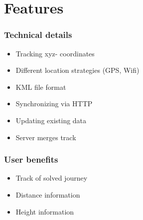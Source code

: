 \section{Features}
\label{sec:features}

\begin{frame}
  \frametitle{Technical details}
  \begin{itemize}
  \item Tracking xyz- coordinates
  \item Different location strategies (GPS, Wifi)
  \item KML file format
  \item Synchronizing via HTTP
  \item Updating existing data
  \item Server merges track
  \end{itemize}
\end{frame}

\begin{frame}
  \frametitle{User benefits}
  \begin{itemize}
  \item Track of solved journey
  \item Distance information
  \item Height information
  \end{itemize}
\end{frame}
